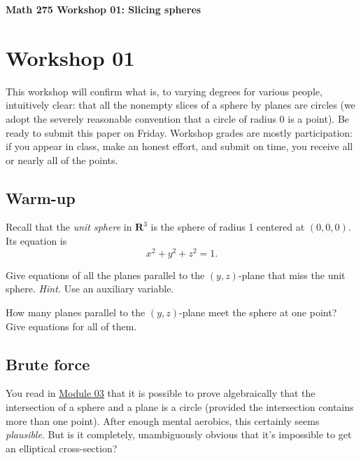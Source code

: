 \documentclass[12pt]{exam}
\begin{document}
\noindent
\textbf{{\large Math 275 \hfill Workshop 01: Slicing spheres}}

\noindent
{} 

\noindent
{} 

\noindent

\section{Workshop 01}

This workshop will confirm what is, to varying degrees for various
people, intuitively clear: that all the nonempty slices of a sphere by
planes are circles (we adopt the severely reasonable convention that a
circle of radius 0 is a point). Be ready to submit this paper on Friday.
Workshop grades are mostly participation: if you appear in class, make
an honest effort, and submit on time, you receive all or nearly all of
the points.

\subsection{Warm-up}

Recall that the \emph{unit sphere} in $\mathbf{R}^3$ is the sphere of
radius 1 centered at $(0,0,0)$. Its equation is
\[ x^2 + y^2 + z^2 = 1. \]

\begin{questions}

\question Give equations of all the planes parallel to the $(y,z)$-plane that miss the unit sphere. \emph{Hint.} Use an auxiliary variable.

\question How many planes parallel to the $(y,z)$-plane meet the sphere at one point? Give equations for all of them.
 
\end{questions}

\subsection{Brute force}

You read in \href{../../Modules/03/Module.html}{Module 03} that it is
possible to prove algebraically that the intersection of a sphere and a
plane is a circle (provided the intersection contains more than one
point). After enough mental aerobics, this certainly seems
\emph{plausible}. But is it completely, unambiguously obvious that it's
impossible to get an elliptical cross-section?
\end{document}
